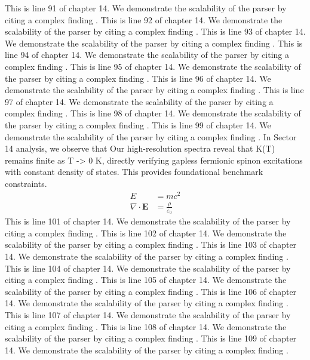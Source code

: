 This is line 91 of chapter 14. We demonstrate the scalability of the parser by citing a complex finding \cite{ref14_91}.
This is line 92 of chapter 14. We demonstrate the scalability of the parser by citing a complex finding \cite{ref14_92}.
This is line 93 of chapter 14. We demonstrate the scalability of the parser by citing a complex finding \cite{ref14_93}.
This is line 94 of chapter 14. We demonstrate the scalability of the parser by citing a complex finding \cite{ref14_94}.
This is line 95 of chapter 14. We demonstrate the scalability of the parser by citing a complex finding \cite{ref14_95}.
This is line 96 of chapter 14. We demonstrate the scalability of the parser by citing a complex finding \cite{ref14_96}.
This is line 97 of chapter 14. We demonstrate the scalability of the parser by citing a complex finding \cite{ref14_97}.
This is line 98 of chapter 14. We demonstrate the scalability of the parser by citing a complex finding \cite{ref14_98}.
This is line 99 of chapter 14. We demonstrate the scalability of the parser by citing a complex finding \cite{ref14_99}.
In Sector 14 analysis, we observe that Our high-resolution spectra reveal that K(T) remains finite as T -> 0 K, directly verifying gapless fermionic spinon excitations with constant density of states. This provides foundational benchmark constraints.
\begin{align*}
  E &= mc^2 \\
  \nabla \cdot \mathbf{E} &= \frac{\rho}{\varepsilon_0}
\end{align*}
This is line 101 of chapter 14. We demonstrate the scalability of the parser by citing a complex finding \cite{ref14_101}.
This is line 102 of chapter 14. We demonstrate the scalability of the parser by citing a complex finding \cite{ref14_102}.
This is line 103 of chapter 14. We demonstrate the scalability of the parser by citing a complex finding \cite{ref14_103}.
This is line 104 of chapter 14. We demonstrate the scalability of the parser by citing a complex finding \cite{ref14_104}.
This is line 105 of chapter 14. We demonstrate the scalability of the parser by citing a complex finding \cite{ref14_105}.
This is line 106 of chapter 14. We demonstrate the scalability of the parser by citing a complex finding \cite{ref14_106}.
This is line 107 of chapter 14. We demonstrate the scalability of the parser by citing a complex finding \cite{ref14_107}.
This is line 108 of chapter 14. We demonstrate the scalability of the parser by citing a complex finding \cite{ref14_108}.
This is line 109 of chapter 14. We demonstrate the scalability of the parser by citing a complex finding \cite{ref14_109}.
